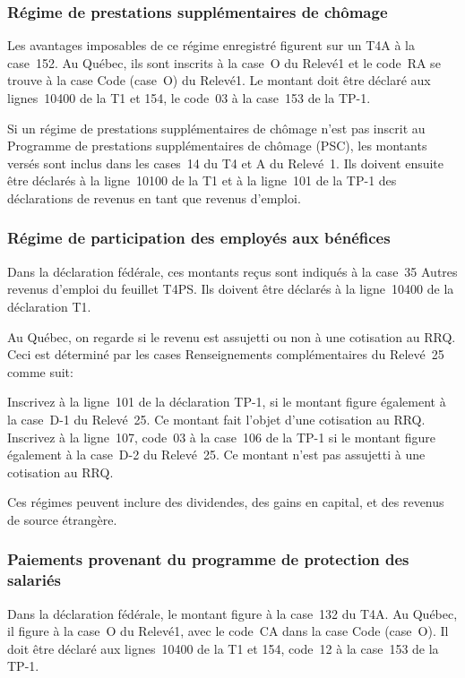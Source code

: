 \subsubsection{Régime de prestations supplémentaires de chômage}
Les avantages imposables de ce régime enregistré figurent sur un T4A à la case~152. Au Québec, ils sont inscrits à la case~O du Relevé1 et le code~RA se trouve à la case Code (case~O) du Relevé1. Le montant doit être déclaré aux lignes~10400 de la T1 et 154, le code~03  à la case~153 de la TP-1.

Si un régime de prestations supplémentaires de chômage n'est pas inscrit au Programme de prestations supplémentaires de chômage (PSC), les montants versés sont inclus dans les cases~14 du T4 et A du Relevé~1. Ils doivent ensuite être déclarés à la ligne~10100 de la T1 et à la ligne~101 de la TP-1 des déclarations de revenus en tant que revenus d'emploi.

\subsubsection{Régime de participation des employés aux bénéfices}
Dans la déclaration fédérale, ces montants reçus sont indiqués à la case~35 Autres revenus d'emploi du feuillet T4PS. Ils doivent être déclarés à la ligne~10400 de la déclaration T1.

Au Québec, on regarde si le revenu est assujetti ou non à une cotisation au RRQ. Ceci est déterminé par les cases Renseignements complémentaires du Relevé~25 comme suit:

Inscrivez à la ligne~101 de la déclaration TP-1, si le montant figure également à la case~D-1 du Relevé~25. Ce montant fait l'objet d'une cotisation au RRQ.
Inscrivez à la ligne~107, code~03 à la case~106 de la TP-1 si le montant figure également à la case~D-2 du Relevé~25. Ce montant n'est pas assujetti à une cotisation au RRQ.

\begin{note}
	Ces régimes peuvent inclure des dividendes, des gains en capital, et des revenus de source étrangère.
\end{note}

\subsubsection{Paiements provenant du programme de protection des salariés}
Dans la déclaration fédérale, le montant figure à la case~132 du T4A. Au Québec, il figure à la case~O du Relevé1, avec le code~CA dans la case  Code (case~O). Il doit être déclaré aux lignes~10400 de la T1 et 154, code~12 à la case~153 de la TP-1.



